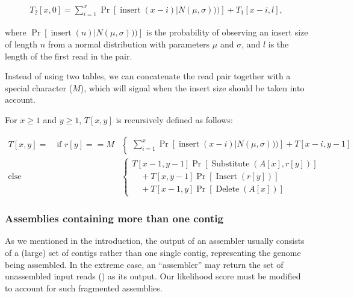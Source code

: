 \begin{align}
T_2[x, 0] = \sum_{i=1}^{x}{\Pr[\operatorname{insert}(x-i)|N(\mu,\sigma)))] + T_1[x-i,l]},
\end{align}

\noindent where $\Pr[\operatorname{insert}(n)|N(\mu,\sigma)))]$ is the probability of observing an insert size of length $n$ from a normal distribution with parameters $\mu$ and $\sigma$, and $l$ is the length of the first read in the pair.

Instead of using two tables, we can concatenate the read pair together with a special character ($M$), which will signal when the insert size should be taken into account.

For $x \geq 1$ and $y \geq 1$, $T[x, y]$ is recursively defined as follows:

\begin{equation}
\begin{aligned}
T[x, y] = \quad
\text{if }r[y] == M&\begin{cases}
\sum_{i=1}^{x}{\Pr[\operatorname{insert}(x-i)|N(\mu,\sigma)))] + T[x-i,y-1]}
\end{cases}
\\
\text{else }&\begin{cases} T[x - 1, y - 1] \Pr[\operatorname{Substitute}(A[x], r[y])] \\
\quad + T[x, y - 1]\Pr[\operatorname{Insert}(r[y])]  \\
\quad + T[x - 1, y]\Pr[\operatorname{Delete}(A[x])]
\end{cases}
\end{aligned}
\end{equation}

\subsubsection{Assemblies containing more than one contig}
As we mentioned in the introduction, the output of an assembler
usually consists of a (large) set of contigs rather than one single
contig, representing the genome being assembled.
In the extreme case, an ``assembler'' may return the set of
unassembled input reads () as its output.  Our likelihood score must be modified to account for such fragmented assemblies.

